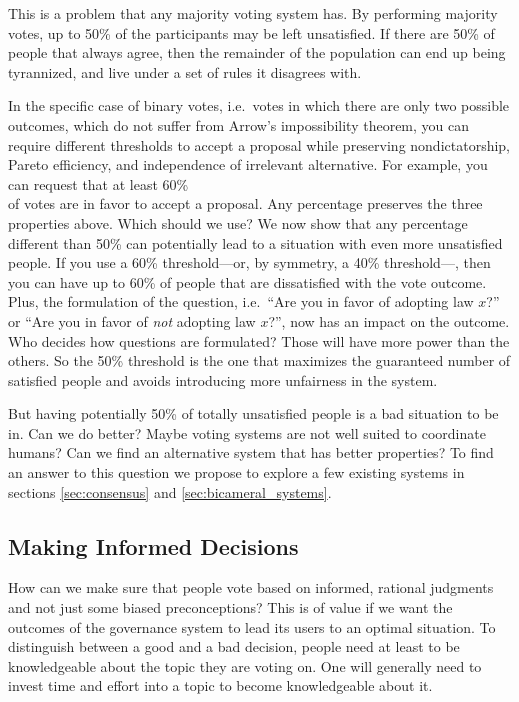 This is a problem that any majority voting system has.
By performing majority votes, up to 50\% of the participants may be left unsatisfied.
If there are 50\% of people that always agree, then the remainder of the population can end up being tyrannized, and live under a set of rules it disagrees with.

In the specific case of binary votes, i.e.\ votes in which there are only two possible outcomes, which do not suffer from Arrow's impossibility theorem, you can require different thresholds to accept a proposal while preserving nondictatorship, Pareto efficiency, and independence of irrelevant alternative.
For example, you can request that at least 60\%\\of votes are in favor to accept a proposal.
Any percentage preserves the three properties above.
Which should we use?
We now show that any percentage different than 50\% can potentially lead to a situation with even more unsatisfied people.
If you use a 60\% threshold---or, by symmetry, a 40\% threshold---, then you can have up to 60\% of people that are dissatisfied with the vote outcome.
Plus, the formulation of the question, i.e.\ \enquote{Are you in favor of adopting law $x$?} or \enquote{Are you in favor of \emph{not} adopting law $x$?}, now has an impact on the outcome.
Who decides how questions are formulated?
Those will have more power than the others.
So the 50\% threshold is the one that maximizes the guaranteed number of satisfied people and avoids introducing more unfairness in the system.

But having potentially 50\% of totally unsatisfied people is a bad situation to be in.
Can we do better?
Maybe voting systems are not well suited to coordinate humans?
Can we find an alternative system that has better properties?
To find an answer to this question we propose to explore a few existing systems in sections \cref{sec:consensus} and \ref{sec:bicameral_systems}.

\subsection{Making Informed Decisions}
\label{sec:making_informed_decisions}

How can we make sure that people vote based on informed, rational judgments and not just some biased preconceptions?
This is of value if we want the outcomes of the governance system to lead its users to an optimal situation.
To distinguish between a good and a bad decision, people need at least to be knowledgeable about the topic they are voting on.
One will generally need to invest time and effort into a topic to become knowledgeable about it.

